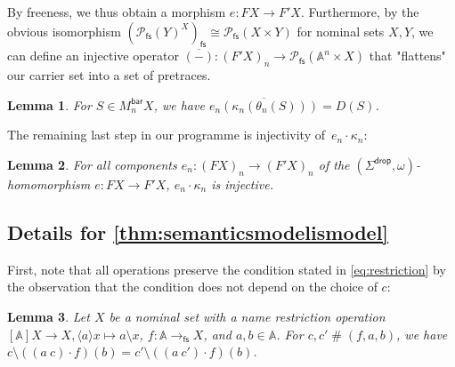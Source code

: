 \documentclass[11pt,a4paper]{amsart}
\newtheorem{lemma}[lemma]{Lemma}
\newcommand{\Br}{\mathsf{bar}}
\newcommand{\Term}{\mathsf{Term}}
\newcommand{\loc}{\mathsf{loc}}
\newcommand{\drop}{\mathsf{drop}}
\newcommand{\fs}{\mathsf{fs}}
\newcommand{\Names}{\mathbb{A}}
\newcommand{\pow}{\mathcal{P}}
\newcommand{\powfs}{\pow_{\fs}}
\newcommand{\fresh}{\mathbin{\#}}
\newcommand{\bind}[1]{\langle #1\rangle}
\theoremstyle{plain}
\numberwithin{equation}{section}
\newcommand{\+}[1]{\mathcal{#1}\xspace}
\theoremstyle{definition}
\begin{document}
\noindent By freeness, we thus obtain a morphism $e\colon FX\to F'X$.
Furthermore, by the obvious isomorphism $(\powfs(Y)^X)_\fs \cong \powfs(X \times Y)$ for nominal sets $X, Y$, we can define an injective operator $\overline{(-)} \colon (F'X)_n \to \powfs(\Names^n \times X)$ that "flattens" our carrier set into a set of pretraces.
\begin{lemma}\label{thm:languageinterpretationofpretraces}
  For $S\in M_n^\Br X$, we have $\overline{e_n(\kappa_n(\theta_n(S)))}=D(S)$.
\end{lemma}
\noindent The remaining last step in our programme is injectivity
of~$e_n \cdot \kappa_n$:
\begin{lemma}\label{thm:localfreshnessinjectivity}
  For all components $e_n : (FX)_n \to (F'X)_n$ of the $(\Sigma^\drop,\omega)$-homomorphism $e\colon FX \to F'X$, $e_n \cdot \kappa_n$ is injective.
\end{lemma}

\subsection*{Details for \cref{thm:semanticsmodelismodel}}

First, note that all operations preserve the condition stated in \eqref{eq:restriction} by the observation that the condition does not depend on the choice of \(c\):

\begin{lemma}
  Let \(X\) be a nominal set with a name restriction operation \([\Names]X \to X, \bind{a} x \mapsto a \setminus x\), \(f\colon \Names \to_\fs X\), and \(a,b \in \Names\).
  For \(c,c'\fresh(f,a,b)\), we have \(c \setminus ((a\ c) \cdot f)(b) = c' \setminus ((a\ c') \cdot f)(b)\).
\end{lemma}
\end{document}
